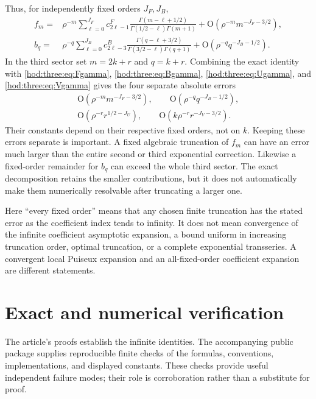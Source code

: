 \documentclass[11pt,letterpaper]{article}
\theoremstyle{definition}\newtheorem{definition}[theorem]{Definition}
\theoremstyle{remark}\newtheorem{remark}[theorem]{Remark}
\newcommand{\OO}{\mathrm O}
\begin{document}
Thus, for independently fixed orders $J_F,J_B$,
\begin{align}
f_m={}&\rho^{-m}\sum_{\ell=0}^{J_F}c^F_{2\ell-1}
\frac{\Gamma(m-\ell+1/2)}{\Gamma(1/2-\ell)\Gamma(m+1)}
+\OO(\rho^{-m}m^{-J_F-3/2}),\label{hod:three:eq:Fgamma}\\
b_q={}&\rho^{-q}\sum_{\ell=0}^{J_B}c^B_{2\ell-3}
\frac{\Gamma(q-\ell+3/2)}{\Gamma(3/2-\ell)\Gamma(q+1)}
+\OO(\rho^{-q}q^{-J_B-1/2}).\label{hod:three:eq:Bgamma}
\end{align}
In the third sector set $m=2k+r$ and $q=k+r$. Combining the exact identity with \eqref{hod:three:eq:Fgamma}, \eqref{hod:three:eq:Bgamma}, \eqref{hod:three:eq:Ugamma}, and \eqref{hod:three:eq:Vgamma} gives the four separate absolute errors
\begin{equation}\label{hod:three:eq:fourerrors}
\begin{gathered}
\OO(\rho^{-m}m^{-J_F-3/2}),\qquad
\OO(\rho^{-q}q^{-J_B-1/2}),\\
\OO(\rho^{-r}r^{1/2-J_U}),\qquad
\OO(k\rho^{-r}r^{-J_V-3/2}).
\end{gathered}
\end{equation}
Their constants depend on their respective fixed orders, not on $k$. Keeping these errors separate is important. A fixed algebraic truncation of $f_m$ can have an error much larger than the entire second or third exponential correction. Likewise a fixed-order remainder for $b_q$ can exceed the whole third sector. The exact decomposition retains the smaller contributions, but it does not automatically make them numerically resolvable after truncating a larger one.

Here ``every fixed order'' means that any chosen finite truncation has the stated error as the coefficient index tends to infinity. It does not mean convergence of the infinite coefficient asymptotic expansion, a bound uniform in increasing truncation order, optimal truncation, or a complete exponential transseries. A convergent local Puiseux expansion and an all-fixed-order coefficient expansion are different statements.

\section{Exact and numerical verification}\label{hod:three:sec:verification}
The article's proofs establish the infinite identities. The accompanying public package supplies reproducible finite checks of the formulas, conventions, implementations, and displayed constants. These checks provide useful independent failure modes; their role is corroboration rather than a substitute for proof.
\end{document}
